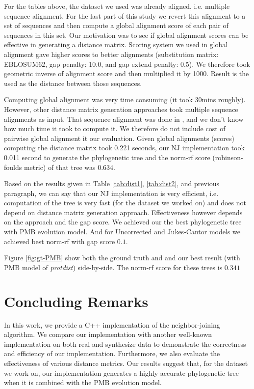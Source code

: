 \documentclass[11pt,letterpaper]{article}
\theoremstyle{definition}
\begin{document}
For the tables above, the dataset we used was already aligned, i.e. multiple sequence alignment. For the last part of this study we revert this alignment to a set of sequences and then compute a global alignment score of each pair of sequences in this set. Our motivation was to see if global alignment scores can be effective in generating a distance matrix. Scoring system we used in global alignment gave higher scores to better alignments (substitution matrix: EBLOSUM62, gap penalty: 10.0, and gap extend penalty: 0.5). We therefore took geometric inverse of  alignment score and then multiplied it by 1000. Result is the used as the distance between those sequences.

Computing global alignment was very time consuming (it took 30mins roughly). However, other distance matrix generation approaches took multiple sequence alignments as input. That sequence alignment was done in \cite{khafif2014identification}, and we don't know how much time it took to compute it. We therefore do not include cost of pairwise global alignment it our evaluation. Given global alignments (scores) computing the distance matrix took 0.221 seconds, our NJ implementation took 0.011 second to generate the phylogenetic tree and the norm-rf score (robinson-foulds metric) of that tree was 0.634.

Based on the results given in Table \ref{tab:dist1}, \ref{tab:dist2}, and previous paragraph, we can say that our NJ implementation is very efficient, i.e. computation of the tree is very fast (for the dataset we worked on) and does not depend on distance matrix generation approach. Effectiveness however depends on the approach and the gap score. We achieved our the best phylogenetic tree with PMB evolution model. And for Uncorrected and Jukes-Cantor models we achieved best norm-rf with gap score $0.1$.

Figure \ref{fig:gt-PMB} show both the ground truth and and our best result (with PMB model of \textit{protdist}) side-by-side. The norm-rf score for these trees is $0.341$



\section{Concluding Remarks}

In this work, we provide a C++ implementation of the neighbor-joining algorithm. We compare our implementation with another well-known implementation on both real and synthesize data to demonstrate the correctness and efficiency of our implementation. Furthermore, we also evaluate the effectiveness of various distance metrics. Our results suggest that, for the dataset we work on, our implementation generates a highly accurate phylogenetic tree when it is combined with the PMB evolution model.




\end{document}

